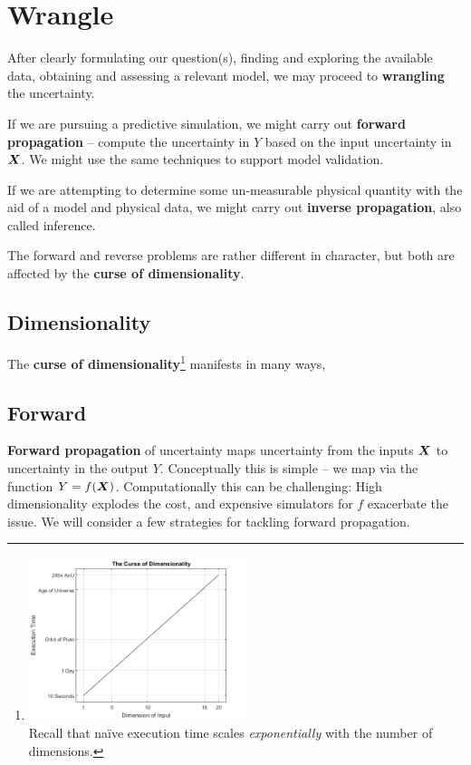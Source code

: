 \documentclass[../primer.tex]{subfiles}
\begin{document}
\chapter{Wrangle}
After clearly formulating our question(s), finding and exploring the available
data, obtaining and assessing a relevant model, we may proceed to
\textbf{wrangling} the uncertainty.

If we are pursuing a predictive simulation, we might carry out \textbf{forward
  propagation} -- compute the uncertainty in $Y$ based on the input uncertainty
in $\boldsymbol{X}$. We might use the same techniques to support model validation.

If we are attempting to determine some un-measurable physical quantity with the
aid of a model and physical data, we might carry out \textbf{inverse
  propagation}, also called inference.

The forward and reverse problems are rather different in character, but both
are affected by the \textbf{curse of dimensionality}.

\section{Dimensionality}
The \textbf{curse of
  dimensionality}\footnote{\includegraphics[width=0.50\textwidth]{./images/curse_of_dimensionality}\\ Recall
  that na\"ive execution time scales \emph{exponentially} with the number of
  dimensions.} manifests in many ways,

\section{Forward}
\textbf{Forward propagation} of uncertainty maps uncertainty from the inputs
$\boldsymbol{X}$ to uncertainty in the output $Y$. Conceptually this is simple -- we map
via the function $Y = f(\boldsymbol{X})$. Computationally this can be challenging: High
dimensionality explodes the cost, and expensive simulators for $f$ exacerbate
the issue. We will consider a few strategies for tackling forward propagation.
\end{document}
